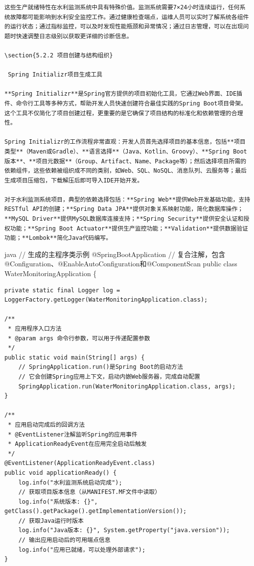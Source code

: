 \begin{lstlisting}
这些生产就绪特性在水利监测系统中具有特殊价值。监测系统需要7×24小时连续运行，任何系统故障都可能影响到水利安全监控工作。通过健康检查端点，运维人员可以实时了解系统各组件的运行状态；通过指标监控，可以及时发现性能瓶颈和异常情况；通过日志管理，可以在出现问题时快速调整日志级别以获取更详细的诊断信息。

\section{5.2.2 项目创建与结构组织}

 Spring Initializr项目生成工具

**Spring Initializr**是Spring官方提供的项目初始化工具，它通过Web界面、IDE插件、命令行工具等多种方式，帮助开发人员快速创建符合最佳实践的Spring Boot项目骨架。这个工具不仅简化了项目创建过程，更重要的是它确保了项目结构的标准化和依赖管理的合理性。

Spring Initializr的工作流程非常直观：开发人员首先选择项目的基本信息，包括**项目类型**（Maven或Gradle）、**语言选择**（Java、Kotlin、Groovy）、**Spring Boot版本**、**项目元数据**（Group、Artifact、Name、Package等）；然后选择项目所需的依赖组件，这些依赖被组织成不同的类别，如Web、SQL、NoSQL、消息队列、云服务等；最后生成项目压缩包，下载解压后即可导入IDE开始开发。

对于水利监测系统项目，典型的依赖选择包括：**Spring Web**提供Web开发基础功能，支持RESTful API的创建；**Spring Data JPA**提供对象关系映射功能，简化数据库操作；**MySQL Driver**提供MySQL数据库连接支持；**Spring Security**提供安全认证和授权功能；**Spring Boot Actuator**提供生产监控功能；**Validation**提供数据验证功能；**Lombok**简化Java代码编写。
\end{lstlisting}

java // 生成的主程序类示例 @SpringBootApplication // 复合注解，包含@Configuration、@EnableAutoConfiguration和@ComponentScan public class WaterMonitoringApplication \{

\begin{verbatim}
private static final Logger log = LoggerFactory.getLogger(WaterMonitoringApplication.class);

/**
 * 应用程序入口方法
 * @param args 命令行参数，可以用于传递配置参数
 */
public static void main(String[] args) {
    // SpringApplication.run()是Spring Boot的启动方法
    // 它会创建Spring应用上下文，启动内嵌Web服务器，完成自动配置
    SpringApplication.run(WaterMonitoringApplication.class, args);
}

/**
 * 应用启动完成后的回调方法
 * @EventListener注解监听Spring的应用事件
 * ApplicationReadyEvent在应用完全启动后触发
 */
@EventListener(ApplicationReadyEvent.class)
public void applicationReady() {
    log.info("水利监测系统启动完成");
    // 获取项目版本信息（从MANIFEST.MF文件中读取）
    log.info("系统版本: {}", getClass().getPackage().getImplementationVersion());
    // 获取Java运行时版本
    log.info("Java版本: {}", System.getProperty("java.version"));
    // 输出应用启动后的可用端点信息
    log.info("应用已就绪，可以处理外部请求");
}
\end{verbatim}

